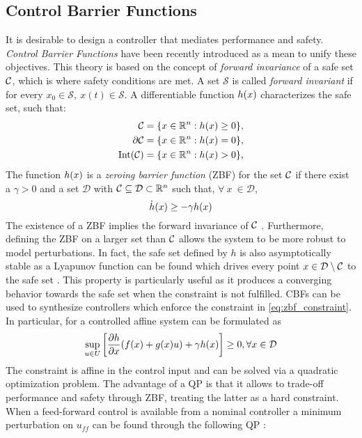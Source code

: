 \subsection{Control Barrier Functions}
It is desirable to design a controller that mediates performance and safety. \emph{Control Barrier Functions} have been recently introduced as a mean to unify these objectives. This theory is based on the concept of \emph{forward invariance} of a safe set $\mathcal{C} $, which is where safety conditions are met. A set $\mathcal{S}$ is called \emph{forward invariant} if for every $x_0 \in \mathcal{S},\ x(t) \in \mathcal{S}$. A differentiable function $h(x)$  characterizes the safe set, such that:
\begin{align*}
    \mathcal{C} &= \{ x \in \mathbb{R}^{n} : h(x) \geq 0 \}, \\
    \partial \mathcal{C} &= \{ x \in \mathbb{R}^{n} : h(x) = 0 \}, \\
    \text{Int}(\mathcal{C}) &= \{ x \in \mathbb{R}^{n} : h(x) > 0 \},
\end{align*}
The function $h(x)$ is a \emph{zeroing barrier function} (ZBF) for the set $ \mathcal{C} $ if there exist a $\gamma > 0$ and a set $\mathcal{D}$ with $\mathcal{C} \subseteq \mathcal{D} \subset \mathbb{R}^{n}$ such that, $\forall \  x \  \in \mathcal{D}$, 
\begin{equation} \label{eq:zbf_constraint}
    \dot{h}(x) \geq -\gamma h(x)
\end{equation}
The existence of a ZBF implies the forward invariance of $\mathcal{C}$ \cite{ames2016control}. Furthermore, defining the ZBF on a larger set than $\mathcal{C}$ allows the system to be more robust to model perturbations. In fact, the safe set defined by $h$ is also asymptotically stable as a Lyapunov function can be found which drives every point $x \in \mathcal{D} \setminus \mathcal{C}$ to the safe set \cite{ames2016control}. This property is particularly useful as it produces a converging behavior towards the safe set when the constraint is not fulfilled. CBFs can be used to synthesize controllers which enforce the constraint in \eqn \eqref{eq:zbf_constraint}. In particular, for a controlled affine system can be formulated as
\begin{equation}
    \sup_{u \in U} \left[ \frac{\partial h }{\partial x} (f(x) + g(x)u) + \gamma h(x) \right] \geq 0, \forall x \in \mathcal{D}
\end{equation}
The constraint is affine in the control input and can be solved via a quadratic optimization problem. The advantage of a QP is that it allows to trade-off performance and safety through ZBF, treating the latter as a hard constraint. When a feed-forward control is available from a nominal controller a minimum perturbation on $u_{ff}$ can be found through the following QP \cite{ames2019control}:
